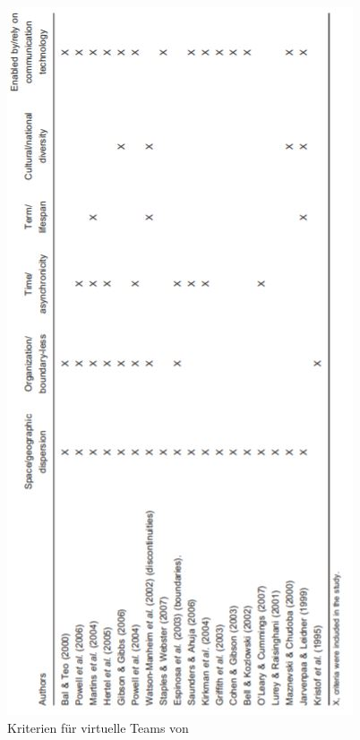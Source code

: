 \documentclass[a4paper,11pt]{article}%
\renewcommand{\\}{\vspace*{0.5\baselineskip} \newline}
\begin{document}
\begin{figure}[H]
		\begin{footnotesize}
			\includegraphics[scale=1]{Abbildungen/criteriaForVirtualTeams.JPG}
			\caption[Kriterien für virtuelle Teams]{Kriterien für virtuelle Teams von \citep[S. 27]{schweitzer2010conceptualizing}}
			\label{criteriaForVirtualTeams}
		\end{footnotesize}
	\end{figure}	
	
	
\end{document}

